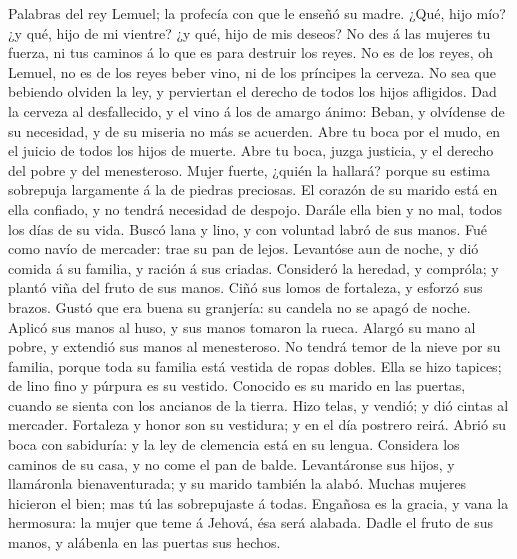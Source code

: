  Palabras del rey Lemuel; la profecía con que le enseñó su
madre.  ¿Qué, hijo mío? ¿y qué, hijo de mi vientre? ¿y qué,
hijo de mis deseos?  No des á las mujeres tu fuerza, ni tus
caminos á lo que es para destruir los reyes.  No es de los
reyes, oh Lemuel, no es de los reyes beber vino, ni de los príncipes la
cerveza.  No sea que bebiendo olviden la ley, y perviertan
el derecho de todos los hijos afligidos.  Dad la cerveza al
desfallecido, y el vino á los de amargo ánimo:  Beban, y
olvídense de su necesidad, y de su miseria no más se acuerden.
 Abre tu boca por el mudo, en el juicio de todos los hijos
de muerte.  Abre tu boca, juzga justicia, y el derecho del
pobre y del menesteroso.  Mujer fuerte, ¿quién la hallará?
porque su estima sobrepuja largamente á la de piedras preciosas.
 El corazón de su marido está en ella confiado, y no tendrá
necesidad de despojo.  Darále ella bien y no mal, todos los
días de su vida.  Buscó lana y lino, y con voluntad labró
de sus manos.  Fué como navío de mercader: trae su pan de
lejos.  Levantóse aun de noche, y dió comida á su familia,
y ración á sus criadas.  Consideró la heredad, y compróla;
y plantó viña del fruto de sus manos.  Ciñó sus lomos de
fortaleza, y esforzó sus brazos.  Gustó que era buena su
granjería: su candela no se apagó de noche.  Aplicó sus
manos al huso, y sus manos tomaron la rueca.  Alargó su
mano al pobre, y extendió sus manos al menesteroso.  No
tendrá temor de la nieve por su familia, porque toda su familia está
vestida de ropas dobles.  Ella se hizo tapices; de lino
fino y púrpura es su vestido.  Conocido es su marido en las
puertas, cuando se sienta con los ancianos de la tierra. 
Hizo telas, y vendió; y dió cintas al mercader.  Fortaleza
y honor son su vestidura; y en el día postrero reirá. 
Abrió su boca con sabiduría: y la ley de clemencia está en su lengua.
 Considera los caminos de su casa, y no come el pan de
balde.  Levantáronse sus hijos, y llamáronla
bienaventurada; y su marido también la alabó.  Muchas
mujeres hicieron el bien; mas tú las sobrepujaste á todas. 
Engañosa es la gracia, y vana la hermosura: la mujer que teme á Jehová,
ésa será alabada.  Dadle el fruto de sus manos, y alábenla
en las puertas sus hechos.
